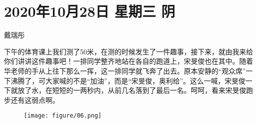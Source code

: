 \section{2020年10月28日 星期三 阴}

戴瑞彤

下午的体育课上我们测了50米，在测的时候发生了一件趣事，接下来，就由我来给你们讲讲这件趣事吧！一排同学整齐地站在各自的跑道上，宋旻俊也在其中。随着华老师的手从上往下那么一挥，这一排同学就飞奔了出去。原本安静的“观众席”一下沸腾了，可大家喊的不是“加油”，而是“宋旻俊，奥利给”。这么一喊，宋旻俊一下就放了水，在短短的一两秒内，从前几名落到了最后一名。呵呵，看来宋旻俊跑步还有这弱点啊。

\begin{figure}[htb]
    \centering
    \texttt{[image: figure/06.png]}
\end{figure}